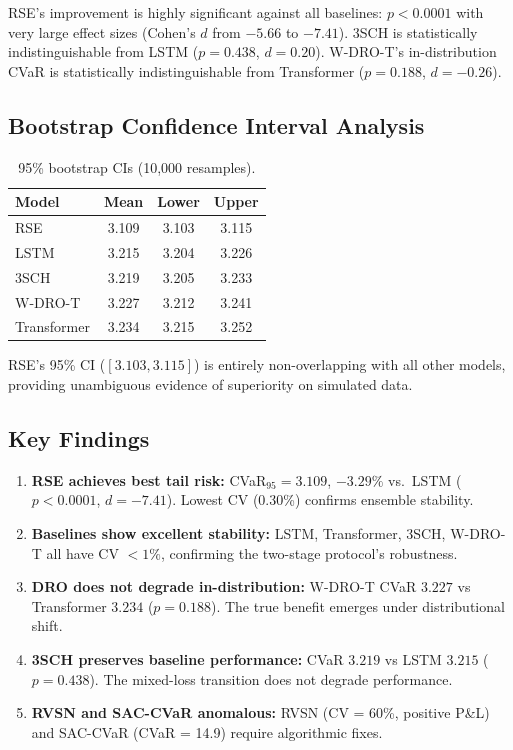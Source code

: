 RSE's improvement is highly significant against all baselines: $p < 0.0001$ with very large effect sizes (Cohen's $d$ from $-5.66$ to $-7.41$). 3SCH is statistically indistinguishable from LSTM ($p = 0.438$, $d = 0.20$). W-DRO-T's in-distribution CVaR is statistically indistinguishable from Transformer ($p = 0.188$, $d = -0.26$).

\subsection{Bootstrap Confidence Interval Analysis}

\begin{table}[H]
\centering\small
\caption{95\% bootstrap CIs (10,000 resamples).}
\label{tab:bootstrap}
\begin{tabular}{@{}lccc@{}}
\toprule
\textbf{Model} & \textbf{Mean} & \textbf{Lower} & \textbf{Upper} \\\midrule
RSE & 3.109 & 3.103 & 3.115 \\
LSTM & 3.215 & 3.204 & 3.226 \\
3SCH & 3.219 & 3.205 & 3.233 \\
W-DRO-T & 3.227 & 3.212 & 3.241 \\
Transformer & 3.234 & 3.215 & 3.252 \\
\bottomrule
\end{tabular}
\end{table}

RSE's 95\% CI ($[3.103, 3.115]$) is entirely non-overlapping with all other models, providing unambiguous evidence of superiority on simulated data.

\subsection{Key Findings}

\begin{enumerate}[noitemsep,leftmargin=*]
    \item \textbf{RSE achieves best tail risk:} CVaR$_{95} = 3.109$, $-3.29\%$ vs.\ LSTM ($p < 0.0001$, $d = -7.41$). Lowest CV (0.30\%) confirms ensemble stability.
    \item \textbf{Baselines show excellent stability:} LSTM, Transformer, 3SCH, W-DRO-T all have CV $< 1\%$, confirming the two-stage protocol's robustness.
    \item \textbf{DRO does not degrade in-distribution:} W-DRO-T CVaR $3.227$ vs Transformer $3.234$ ($p = 0.188$). The true benefit emerges under distributional shift.
    \item \textbf{3SCH preserves baseline performance:} CVaR $3.219$ vs LSTM $3.215$ ($p = 0.438$). The mixed-loss transition does not degrade performance.
    \item \textbf{RVSN and SAC-CVaR anomalous:} RVSN (CV = 60\%, positive P\&L) and SAC-CVaR (CVaR = 14.9) require algorithmic fixes.
\end{enumerate}

